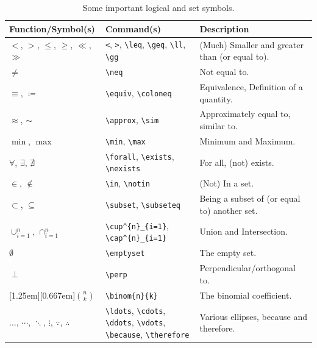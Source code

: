 \begin{table}[ht!]
\begin{tabularx}{\textwidth}{|p{}|>{\raggedright}p{}|X|}
\hline
Function/Symbol(s) & Command(s) & Description \\
\hline
$<$, $>$, $\leq$, $\geq$, $\ll$, $\gg$ & \texttt{<}, \texttt{>}, \texttt{\textbackslash leq}, \texttt{\textbackslash geq}, \texttt{\textbackslash ll}, \texttt{\textbackslash gg} & (Much) Smaller and greater than (or equal to). \\
\hline
$\neq$ & \texttt{\textbackslash neq} & Not equal to. \\
\hline
$\equiv$, $\coloneq$ & \texttt{\textbackslash equiv}, \texttt{\textbackslash coloneq} & Equivalence, Definition of a quantity. \\
\hline
$\approx$, $\sim$ & \texttt{\textbackslash approx}, \texttt{\textbackslash sim} & Approximately equal to, similar to. \\
\hline
$\min$, $\max$ & \texttt{\textbackslash min}, \texttt{\textbackslash max} & Minimum and Maximum. \\
\hline
$\forall$, $\exists$, $\nexists$ & \texttt{\textbackslash forall}, \texttt{\textbackslash exists}, \texttt{\textbackslash nexists} & For all, (not) exists. \\
\hline
$\in$, $\notin$ & \texttt{\textbackslash in}, \texttt{\textbackslash notin} & (Not) In a set. \\
\hline 
$\subset$, $\subseteq$ & \texttt{\textbackslash subset}, \texttt{\textbackslash subseteq} & Being a subset of (or equal to) another set.\\
\hline
$\cup^{n}_{i=1}$, $\cap^{n}_{i=1}$ & \texttt{\textbackslash cup\^{}\{n\}\_\{i=1\}}, \texttt{\textbackslash cap\^{}\{n\}\_\{i=1\}} & Union and Intersection. \\
\hline
$\emptyset$ & \texttt{\textbackslash emptyset} & The empty set. \\
\hline
$\perp$ & \texttt{\textbackslash perp} & Perpendicular/orthogonal to. \\
\hline
\raisebox{0pt}[1.25em][0.667em]{$\binom{n}{k}$} & \texttt{\textbackslash binom\{n\}\{k\}} & The binomial coefficient. \\
\hline
$\ldots$, $\cdots$, $\ddots$, $\vdots$, $\because$, $\therefore$ & \texttt{\textbackslash ldots}, \texttt{\textbackslash cdots}, \texttt{\textbackslash ddots}, \texttt{\textbackslash vdots}, \texttt{\textbackslash because}, \texttt{\textbackslash therefore} & Various ellipses, because and therefore. \\
\hline
\end{tabularx}
\caption{Some important logical and set symbols.}
\label{tab:logicsetsymbol}
\end{table}

